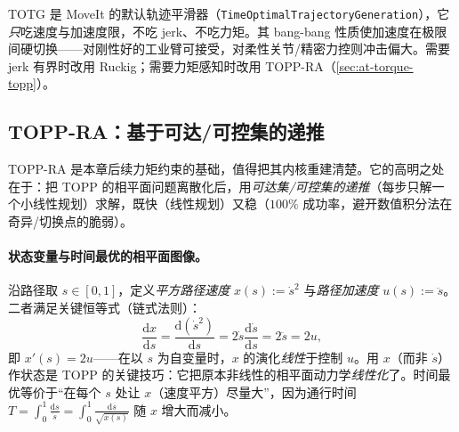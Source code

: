 \begin{note}
TOTG 是 MoveIt 的默认轨迹平滑器（\texttt{TimeOptimalTrajectoryGeneration}），它\emph{只}吃速度与加速度限，不吃 jerk、不吃力矩。其 bang-bang 性质使加速度在极限间硬切换——对刚性好的工业臂可接受，对柔性关节/精密力控则冲击偏大。需要 jerk 有界时改用 Ruckig；需要力矩感知时改用 TOPP-RA（\cref{sec:at-torque-topp}）。
\end{note}

\subsection{TOPP-RA：基于可达/可控集的递推}
\label{subsec:at-toppra}

TOPP-RA 是本章后续力矩约束的基础，值得把其内核重建清楚\cite{pham2018toppra}。它的高明之处在于：把 TOPP 的相平面问题离散化后，用\emph{可达集/可控集的递推}（每步只解一个小线性规划）求解，既快（线性规划）又稳（$100\%$ 成功率，避开数值积分法在奇异/切换点的脆弱）。

\paragraph{状态变量与时间最优的相平面图像。}
沿路径取 $s\in[0,1]$，定义\emph{平方路径速度} $x(s):=\dot s^2$ 与\emph{路径加速度} $u(s):=\ddot s$。二者满足关键恒等式（链式法则）：
\begin{equation}
  \frac{\mathrm{d}x}{\mathrm{d}s}=\frac{\mathrm{d}(\dot s^2)}{\mathrm{d}s}=2\dot s\frac{\mathrm{d}\dot s}{\mathrm{d}s}=2\ddot s=2u,
  \label{eq:at-topp-xrel}
\end{equation}
即 $x'(s)=2u$——在以 $s$ 为自变量时，$x$ 的演化\emph{线性}于控制 $u$。用 $x$（而非 $\dot s$）作状态是 TOPP 的关键技巧：它把原本非线性的相平面动力学\emph{线性化}了。时间最优等价于“在每个 $s$ 处让 $x$（速度平方）尽量大”，因为通行时间 $T=\int_0^1\frac{\mathrm{d}s}{\dot s}=\int_0^1\frac{\mathrm{d}s}{\sqrt{x(s)}}$ 随 $x$ 增大而减小。

